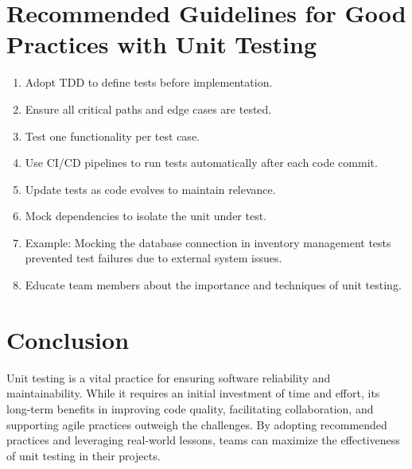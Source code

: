 \documentclass[a4paper,12pt]{article}
\begin{document}
\section{Recommended Guidelines for Good Practices with Unit Testing}
\begin{enumerate}

    \item Adopt TDD to define tests before implementation.
    \item Ensure all critical paths and edge cases are tested.
    \item Test one functionality per test case.
    \item Use CI/CD pipelines to run tests automatically after each code commit.
    \item Update tests as code evolves to maintain relevance.
    \item Mock dependencies to isolate the unit under test.
    \item Example: Mocking the database connection in inventory management tests prevented test failures due to external system issues.
    \item Educate team members about the importance and techniques of unit testing.
\end{enumerate}
\section{Conclusion}
Unit testing is a vital practice for ensuring software reliability and maintainability. While it requires an
initial investment of time and effort, its long-term benefits in improving code quality, facilitating
collaboration, and supporting agile practices outweigh the challenges. By adopting recommended practices and
leveraging real-world lessons, teams can maximize the effectiveness of unit testing in their projects.
\end{document}
